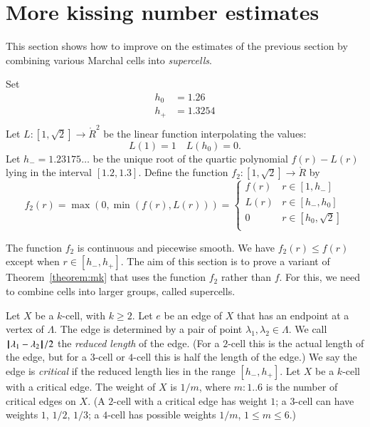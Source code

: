 \section{More kissing number estimates}

This section shows how to improve on the estimates of the previous section
by combining various Marchal cells into {\it supercells}.

\begin{definition}
Set
$$
\begin{array}{lll}
  h_0  &= 1.26\\
  h_+  &= 1.3254\\
\end{array}
$$
Let $L:[1,\sqrt{2}]\to\ring{R}^2$ be the linear function interpolating the
values:
$$
L(1) = 1\quad L(h_0) = 0.
$$
Let $h_- = 1.23175\ldots$ be the unique root of the quartic polynomial
$f(r)-L(r)$ lying in the interval $[1.2,1.3]$.
Define the function $f_2:[1,\sqrt{2}]\to\ring{R}$ by
$$
f_2(r) = \max(0,\min(f(r),L(r))) = 
\begin{cases}
  f(r) & r \in [1,h_-]\\
  L(r) & r \in [h_-,h_0]\\
  0 & r \in [h_0,\sqrt2]\\
\end{cases}
$$
\end{definition}

The function $f_2$ is continuous and piecewise smooth.  We have
$f_2(r)\le f(r)$ except when $r\in [h_-,h_+]$.  The aim of this section is to prove a variant of Theorem~\ref{theorem:mk} that uses the function $f_2$ rather than $f$.  For this, we need to combine cells into larger groups, called supercells.

\begin{definition}
Let $X$ be a $k$-cell, with $k\ge 2$.  Let $e$ be an edge of $X$ that
has an endpoint at a vertex of $\Lambda$.  The edge is determined by
a pair of point $\lambda_1,\lambda_2\in\Lambda$.  We call
${\hskip0.1em|\hskip-0.15em|\hskip0.1em}\lambda_1 - \lambda_2{\hskip0.1em|\hskip-0.15em|\hskip0.1em}/2$ the {\it reduced length} of the edge.
(For a $2$-cell this is the actual length of the edge, but for a $3$-cell
or $4$-cell this is half the length of the edge.)
We say the edge is {\it critical} if the reduced length lies in the
range $[h_-,h_+]$.
Let $X$ be a $k$-cell with a critical edge.  The weight of $X$  
is $1/m$, where $m:1..6$ is the
number of critical edges on $X$.
(A $2$-cell with a critical edge has weight $1$; a $3$-cell can have
weights $1$, $1/2$, $1/3$; a $4$-cell has possible weights $1/m$, $1\le m\le 6$.)
\end{definition}

